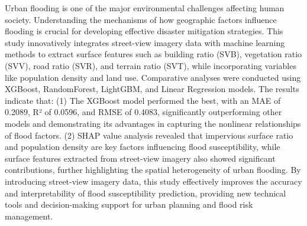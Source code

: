 \begin{eabstract}

\ifshowtext
Urban flooding is one of the major environmental challenges affecting human society. Understanding the mechanisms of how geographic factors influence flooding is crucial for developing effective disaster mitigation strategies. This study innovatively integrates street-view imagery data with machine learning methods to extract surface features such as building ratio (SVB), vegetation ratio (SVV), road ratio (SVR), and terrain ratio (SVT), while incorporating variables like population density and land use. Comparative analyses were conducted using XGBoost, RandomForest, LightGBM, and Linear Regression models. The results indicate that: (1) The XGBoost model performed the best, with an MAE of 0.2089, R² of 0.0596, and RMSE of 0.4083, significantly outperforming other models and demonstrating its advantages in capturing the nonlinear relationships of flood factors. (2) SHAP value analysis revealed that impervious surface ratio and population density are key factors influencing flood susceptibility, while surface features extracted from street-view imagery also showed significant contributions, further highlighting the spatial heterogeneity of urban flooding. By introducing street-view imagery data, this study effectively improves the accuracy and interpretability of flood susceptibility prediction, providing new technical tools and decision-making support for urban planning and flood risk management.
\fi
\end{eabstract}


